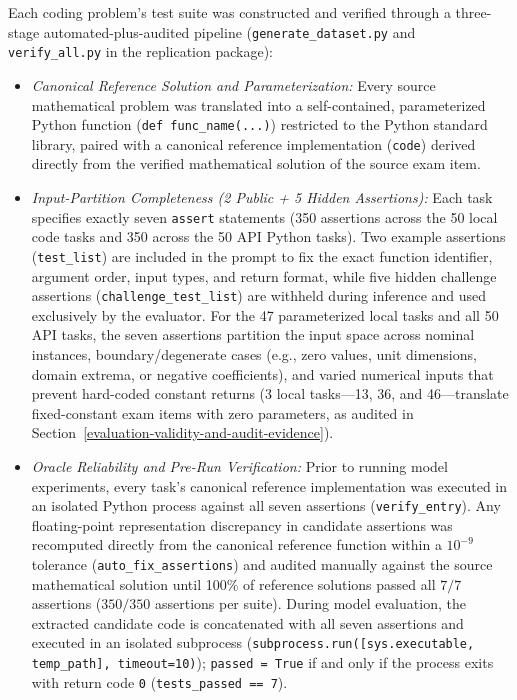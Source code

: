 \documentclass[a4paper,fleqn]{cas-sc}
\providecommand{\tightlist}{%
  \setlength{\itemsep}{0pt}\setlength{\parskip}{0pt}}
\begin{document}
\begin{enumerate}
Each coding problem's test suite was constructed and verified through a three-stage automated-plus-audited pipeline (\texttt{generate\_dataset.py} and \texttt{verify\_all.py} in the replication package):
\begin{itemize}
\tightlist
\item \emph{Canonical Reference Solution and Parameterization:} Every source mathematical problem was translated into a self-contained, parameterized Python function (\texttt{def func\_name(...)}) restricted to the Python standard library, paired with a canonical reference implementation (\texttt{code}) derived directly from the verified mathematical solution of the source exam item.
\item \emph{Input-Partition Completeness (2 Public + 5 Hidden Assertions):} Each task specifies exactly seven \texttt{assert} statements (350 assertions across the 50 local code tasks and 350 across the 50 API Python tasks). Two example assertions (\texttt{test\_list}) are included in the prompt to fix the exact function identifier, argument order, input types, and return format, while five hidden challenge assertions (\texttt{challenge\_test\_list}) are withheld during inference and used exclusively by the evaluator. For the 47 parameterized local tasks and all 50 API tasks, the seven assertions partition the input space across nominal instances, boundary/degenerate cases (e.g., zero values, unit dimensions, domain extrema, or negative coefficients), and varied numerical inputs that prevent hard-coded constant returns (3 local tasks—13, 36, and 46—translate fixed-constant exam items with zero parameters, as audited in Section~\ref{evaluation-validity-and-audit-evidence}).
\item \emph{Oracle Reliability and Pre-Run Verification:} Prior to running model experiments, every task's canonical reference implementation was executed in an isolated Python process against all seven assertions (\texttt{verify\_entry}). Any floating-point representation discrepancy in candidate assertions was recomputed directly from the canonical reference function within a $10^{-9}$ tolerance (\texttt{auto\_fix\_assertions}) and audited manually against the source mathematical solution until 100\% of reference solutions passed all $7/7$ assertions ($350/350$ assertions per suite). During model evaluation, the extracted candidate code is concatenated with all seven assertions and executed in an isolated subprocess (\texttt{subprocess.run([sys.executable, temp\_path], timeout=10)}); \texttt{passed = True} if and only if the process exits with return code \texttt{0} (\texttt{tests\_passed == 7}).
\end{itemize}


\end{enumerate}
\end{document}
